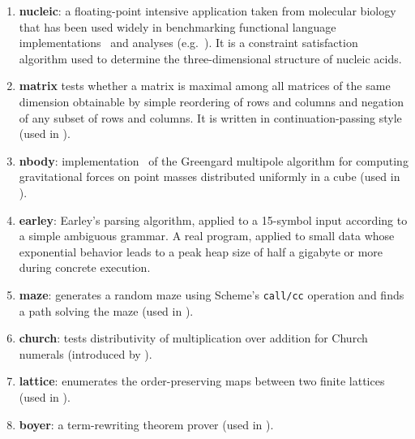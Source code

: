 \documentclass[preprint,onecolumn,9pt]{sigplanconf} %
\begin{document}
\begin{enumerate}  %

\item {\bf nucleic}: a floating-point intensive application taken from molecular biology that has been used widely in benchmarking functional language implementations~\cite{dvanhorn:Hartel1996Benchmarking} and analyses (e.g.~\cite{dvanhorn:wright-jagannathan-toplas98,dvanhorn:jagannathan-etal-popl98}).
%
  It is a constraint satisfaction algorithm used to determine the three-dimensional structure of nucleic acids.

\item {\bf matrix} tests whether a matrix is maximal among all matrices of the same dimension obtainable by simple reordering of rows and columns and negation of any subset of rows and columns.
%
  It is written in continuation-passing style (used in \cite{dvanhorn:wright-jagannathan-toplas98,dvanhorn:jagannathan-etal-popl98}).


\item {\bf nbody}: implementation~\cite{ianjohnson:nbody87} of the Greengard multipole algorithm for computing gravitational forces on point masses distributed uniformly in a cube (used in \cite{dvanhorn:wright-jagannathan-toplas98,dvanhorn:jagannathan-etal-popl98}).

\item {\bf earley}: Earley's parsing algorithm, applied to a 15-symbol input according to a simple ambiguous grammar.
%
  A real program, applied to small data whose exponential behavior leads to a peak heap size of half a gigabyte or more during concrete execution.

\item {\bf maze}: generates a random maze using Scheme's {\tt call/cc} operation and finds a path solving the maze (used in \cite{dvanhorn:wright-jagannathan-toplas98,dvanhorn:jagannathan-etal-popl98}).

\item {\bf church}: tests distributivity of multiplication over addition for Church numerals (introduced by \cite{dvanhorn:Vardoulakis2011CFA2}).

\item {\bf lattice}: enumerates the order-preserving maps between two finite lattices (used in \cite{dvanhorn:wright-jagannathan-toplas98,dvanhorn:jagannathan-etal-popl98}).

\item {\bf boyer}: a term-rewriting theorem prover (used in \cite{dvanhorn:wright-jagannathan-toplas98,dvanhorn:jagannathan-etal-popl98}).


\end{enumerate}
\end{document}
